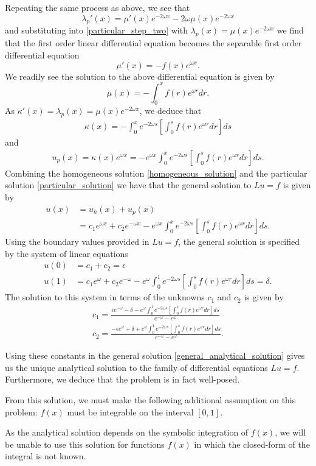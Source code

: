 Repeating the same process as above, we see that
\[
\lambda_p'(x) = \mu'(x) e^{-2 \omega x} - 2 \omega\mu(x) e^{-2 \omega x}
\]
and substituting into \eqref{particular_step_two} with $\lambda_p(x) = \mu(x) e^{-2\omega x}$
we find that the first order linear differential equation becomes the separable first order differential
equation
\[
\mu'(x) = -f(x)e^{\omega x}.
\]
We readily see the solution to the above differential equation is given by
\[
\mu(x) = - \int_{0}^x f(r) e^{\omega r} dr.
\]
As $\kappa'(x) = \lambda_p(x) = \mu(x)e^{-2\omega x}$, we deduce that
\begin{align*}
  \kappa(x) = - \int_{0}^{x} e^{-2 \omega s} \left[ \int_{0}^s f(r) e^{\omega r} dr \right] ds
\end{align*}
and
\begin{align}\label{particular_solution}
  u_p(x) = \kappa(x)e^{\omega x} = -e^{\omega x} \int_{0}^{x} e^{-2 \omega s} \left[ \int_{0}^s f(r) e^{\omega r} dr \right] ds.
\end{align}
Combining the homogeneous solution \eqref{homogeneous_solution} and the particular
solution \eqref{particular_solution} we have that the general solution to
$Lu = f$ is given by
\begin{align}\label{general_analytical_solution}
  u(x) &= u_h(x) + u_p(x) \nonumber \\
  &= c_1 e^{\omega x} + c_2 e^{-\omega x} - e^{\omega x} \int_{0}^{x} e^{-2 \omega s} \left[ \int_{0}^s f(r) e^{\omega r} dr \right] ds.
\end{align}
Using the boundary values provided in $Lu=f$, the general solution is specified
by the system of linear equations
\begin{align*}
  u(0) &= c_1 + c_2 = \epsilon \\
  u(1) &= c_1 e^{\omega} + c_2 e^{-\omega} - e^{\omega} \int_{0}^{1} e^{-2 \omega s} \left[ \int_{0}^s f(r) e^{\omega r} dr \right] ds = \delta .
\end{align*}
The solution to this system in terms of the unknowns $c_1$ and $c_2$ is given
by
\begin{align*}
  c_1 = \frac{\epsilon e^{-\omega} - \delta - e^{\omega} \int_{0}^{1} e^{-2 \omega s} \left[ \int_{0}^s f(r) e^{\omega r} dr \right] ds}{e^{-\omega} - e^{\omega}}\\
  c_2 = \frac{-\epsilon e^{\omega} + \delta + e^{\omega} \int_{0}^{1} e^{-2 \omega s} \left[ \int_{0}^s f(r) e^{\omega r} dr \right] ds}{e^{-\omega} - e^{\omega}}.
\end{align*}

Using these constants in the general solution \eqref{general_analytical_solution}
gives us the unique analytical solution to the family of differential equations $Lu = f$.
Furthermore, we deduce that the problem is in fact well-posed.

From this solution, we must make the following additional assumption on this
problem: $f(x)$ must be integrable on the interval $[0, 1]$.

As the analytical solution depends on the symbolic integration of $f(x)$, we
will be unable to use this solution for functions $f(x)$ in which the
closed-form of the integral is not known.

